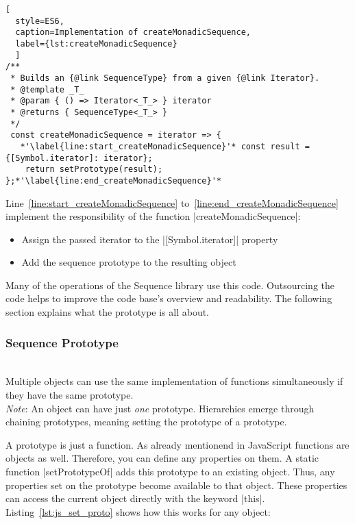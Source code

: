 \begin{lstlisting}[
  style=ES6, 
  caption=Implementation of createMonadicSequence,
  label={lst:createMonadicSequence}
  ]
/**
 * Builds an {@link SequenceType} from a given {@link Iterator}.
 * @template _T_
 * @param { () => Iterator<_T_> } iterator
 * @returns { SequenceType<_T_> }
 */
 const createMonadicSequence = iterator => {
   *'\label{line:start_createMonadicSequence}'* const result = {[Symbol.iterator]: iterator};
    return setPrototype(result);
};*'\label{line:end_createMonadicSequence}'*
\end{lstlisting}

Line~\ref{line:start_createMonadicSequence}
to~\ref{line:end_createMonadicSequence} implement the responsibility of the
function |createMonadicSequence|:

\begin{itemize}
  \item{Assign the passed iterator to the |[Symbol.iterator]| property}
  \item{Add the sequence prototype to the resulting object}
\end{itemize}

Many of the operations of the Sequence library use this code.
Outsourcing the code helps to improve the code base's overview and readability.
The following section explains what the prototype is all about.

\subsubsection{Sequence Prototype}
\label{subsub:Sequence Prototype}
\\ 
Multiple objects can use the same implementation of functions simultaneously if
they have the same prototype.\\
\textit{Note}: An object can have just \textit{one} prototype. Hierarchies
emerge through chaining prototypes, meaning setting the prototype of a
prototype.

A prototype is just a function. As already mentionend in JavaScript functions
are objects as well. Therefore, you can define any properties on them. A static
function |setPrototypeOf| adds this prototype to an existing object. Thus, any
properties set on the prototype become available to that object. These
properties can access the current object directly with the keyword |this|.
Listing~\ref{lst:js_set_proto} shows how this works for any object:

